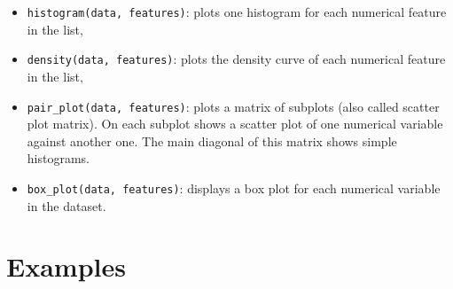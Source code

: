 \documentclass{42-en}
\begin{document}

\begin{itemize}
  \item \texttt{histogram(data, features)}: plots one histogram for each numerical feature in the list,
  \item \texttt{density(data, features)}: plots the density curve of each numerical feature in the list,
  \item \texttt{pair\_plot(data, features)}: plots a matrix of subplots (also called scatter plot matrix).
        On each subplot shows a scatter plot of one numerical variable against another one.
        The main diagonal of this matrix shows simple histograms.
  \item \texttt{box\_plot(data, features)}: displays a box plot for each numerical variable in the dataset.
\end{itemize}

\section*{Examples}
\end{document}

